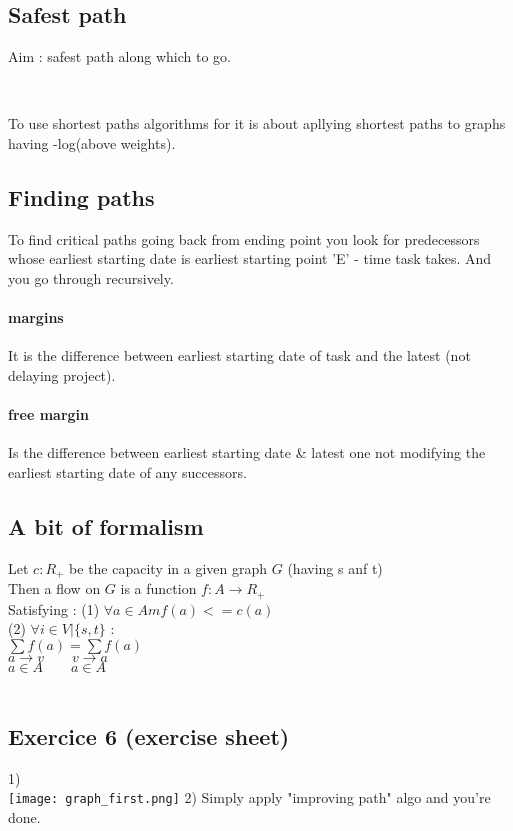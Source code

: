 \documentclass[a4paper,11pt]{article}
\begin{document}
\subsection{Safest path}
Aim : safest path along which to go.

\

To use shortest paths algorithms for it  is about apllying shortest paths to graphs having  -log(above weights).

\subsection{Finding paths}
To find critical paths going back from ending point you look for predecessors whose earliest starting date  is earliest starting point 'E' - time task takes. And you go through recursively.

\paragraph{margins} \hfill \break
It is the difference between earliest starting date of task and the latest (not delaying project).

\paragraph{free margin} \hfill \break
Is the difference between earliest starting date \& latest one not modifying the earliest starting date of any successors.\\

\subsection{A bit of formalism}

Let $ c : R_+$ be the capacity in a given graph $G$  (having s anf t)\\
Then a flow on $G$ is a function $f:A \rightarrow R_+$\\
Satisfying :
(1) $\forall a \in A m f(a) <=  c(a) $\\
(2) $\forall i \in V|\{s,t\}$ :\\
$\sum f(a) = \sum f(a)$\\
$a \rightarrow v \quad \quad v \rightarrow a$\\
$ a \in A \quad \quad a \in A$\\
\\

\subsection{Exercice 6 (exercise sheet)}
1)\\
\texttt{[image: graph\_first.png]}
2)
Simply apply "improving path" algo and you're done.
\end{document}
